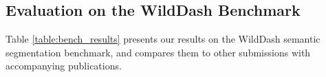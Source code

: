 \documentclass[runningheads]{llncs}
\begin{document}
\begin{comment}
Siniša moved this to section 3

When training with
outliers, we try to make sure that full outlier images make up
half of the batch. We do this by creating a batch with only
outlier images and then swap each of them with an inlier image
with a probability of 0.5. This inlier image can contain
only inlier pixels, but we can also
train with pasting. When training
that way, the ImageNet-1k image selected for swapping is 
rescaled to make its area equal
to 5\% of a randomly selected inlier image area and then pasted
into a random location of that image.

Usages of ImageNet-1k-full and ImageNet-1k-bb also differ slightly. When 
ImageNet-1k-full dataset is used, all of the pixels of the outlier 
image are marked as outlier. If used with pasting
the entire image is pasted into an
inlier image. When ImageNet-1k-bb dataset is used, only the pixels 
inside the bounding box are marked as outlier, the rest are set to 
ignore. If ImageNet-1k-bb is used in tandem with pasting, only
the rectangle containing the object is pasted into the inlier image.
\end{comment}




\subsection{Evaluation on the WildDash Benchmark}
\label{ss:benchmark}





Table \ref{table:bench_results} 
presents our results on 
the WildDash semantic segmentation benchmark, and compares them to other submissions
with accompanying publications.
\end{document}
